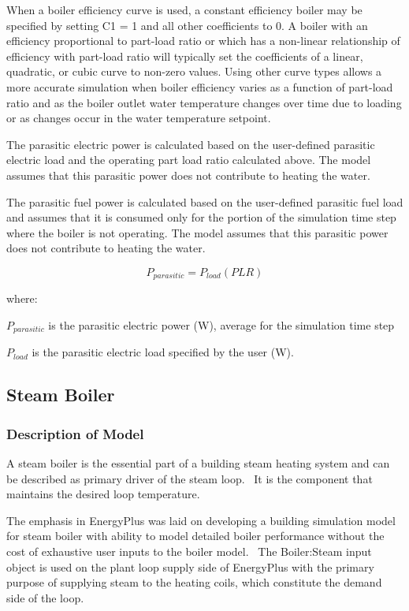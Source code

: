 When a boiler efficiency curve is used, a constant efficiency boiler may be specified by setting C1 = 1 and all other coefficients to 0. A boiler with an efficiency proportional to part-load ratio or which has a non-linear relationship of efficiency with part-load ratio will typically set the coefficients of a linear, quadratic, or cubic curve to non-zero values. Using other curve types allows a more accurate simulation when boiler efficiency varies as a function of part-load ratio and as the boiler outlet water temperature changes over time due to loading or as changes occur in the water temperature setpoint.

The parasitic electric power is calculated based on the user-defined parasitic electric load and the operating part load ratio calculated above. The model assumes that this parasitic power does not contribute to heating the water.

The parasitic fuel power is calculated based on the user-defined parasitic fuel load and assumes that it is consumed only for the portion of the simulation time step where the boiler is not operating. The model assumes that this parasitic power does not contribute to heating the water.

\begin{equation}
{P_{parasitic}} = {P_{load}}\left( {PLR} \right)
\end{equation}

where:

\({P_{parasitic}}\) is the parasitic electric power (W), average for the simulation time step

\({P_{load}}\) is the parasitic electric load specified by the user (W).

\subsection{Steam Boiler}\label{steam-boiler}

\subsubsection{Description of Model}\label{description-of-model}

A steam boiler is the essential part of a building steam heating system and can be described as primary driver of the steam loop.~ It is the component that maintains the desired loop temperature.

The emphasis in EnergyPlus was laid on developing a building simulation model for steam boiler with ability to model detailed boiler performance without the cost of exhaustive user inputs to the boiler model.~ The Boiler:Steam input object is used on the plant loop supply side of EnergyPlus with the primary purpose of supplying steam to the heating coils, which constitute the demand side of the loop.

